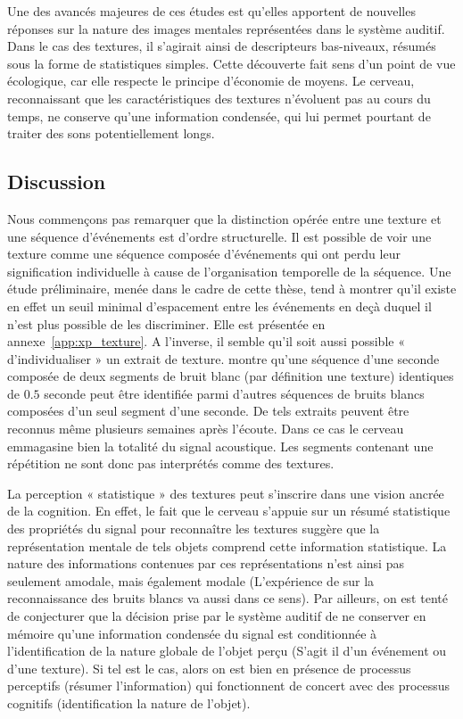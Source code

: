 Une des avancés majeures de ces études est qu'elles apportent de nouvelles réponses sur la nature des images mentales représentées dans le système auditif. Dans le cas des textures, il s'agirait ainsi de descripteurs bas-niveaux, résumés sous la forme de statistiques simples. Cette découverte fait sens d'un point de vue écologique, car elle respecte le principe d'économie de moyens. Le cerveau, reconnaissant que les caractéristiques des textures n'évoluent pas au cours du temps, ne conserve qu'une information condensée, qui lui permet pourtant de traiter des sons potentiellement longs. 

\subsection{Discussion}
\label{sec:ch3_textureDiscussion}

Nous commençons pas remarquer que la distinction opérée entre une texture et une séquence d'événements est d'ordre structurelle. Il est possible de voir une texture comme une séquence composée d'événements qui ont perdu leur signification individuelle à cause de l'organisation temporelle de la séquence. Une étude préliminaire, menée dans le cadre de cette thèse, tend à montrer qu'il existe en effet un seuil minimal d'espacement entre les événements en deçà duquel il n'est plus possible de les discriminer. Elle est présentée en annexe~\ref{app:xp_texture}. A l'inverse, il semble qu'il soit aussi possible « d'individualiser » un extrait de texture. \citep{agus2010rapid} montre qu'une séquence d'une seconde composée de deux segments de bruit blanc (par définition une texture) identiques de $0.5$ seconde peut être identifiée parmi d'autres séquences de bruits blancs composées d'un seul segment d'une seconde. De tels extraits peuvent être reconnus même plusieurs semaines après l'écoute. Dans ce cas le cerveau emmagasine bien la totalité du signal acoustique. Les segments contenant une répétition ne sont donc pas interprétés comme des textures.

La perception « statistique » des textures peut s'inscrire dans une vision ancrée de la cognition. En effet, le fait que le cerveau s'appuie sur un résumé statistique des propriétés du signal pour reconnaître les textures suggère que la représentation mentale de tels objets comprend cette information statistique. La nature des informations contenues par ces représentations n'est ainsi pas seulement amodale, mais également modale (L'expérience de \citep{agus2010rapid} sur la reconnaissance des bruits blancs va aussi dans ce sens). Par ailleurs, on est tenté de conjecturer que la décision prise par le système auditif de ne conserver en mémoire qu'une information condensée du signal est conditionnée à l'identification de la nature globale de l'objet perçu (S'agit il d'un événement ou d'une texture). Si tel est le cas, alors on est bien en présence de processus perceptifs (résumer l'information) qui fonctionnent de concert avec des processus cognitifs (identification la nature de l'objet).

